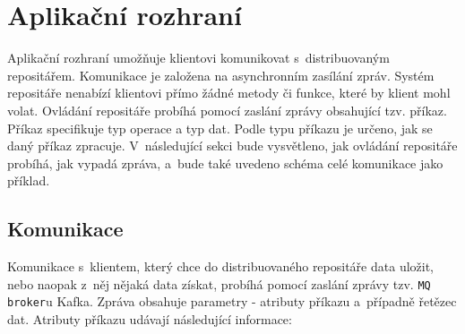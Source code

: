 \section{Aplikační rozhraní}
Aplikační rozhraní umožňuje klientovi komunikovat s~distribuovaným repositářem. Komunikace je založena na asynchronním zasílání zpráv. Systém repositáře nenabízí klientovi přímo žádné metody či funkce, které by klient mohl volat. Ovládání repositáře probíhá pomocí zaslání zprávy obsahující tzv. příkaz. Příkaz specifikuje typ operace a typ dat. Podle typu příkazu je určeno, jak se daný příkaz zpracuje. V~následující sekci bude vysvětleno, jak ovládání repositáře probíhá, jak vypadá zpráva, a~bude také uvedeno schéma celé komunikace jako příklad.

\subsection{Komunikace}
Komunikace s~klientem, který chce do distribuovaného repositáře data uložit, nebo naopak z~něj nějaká data získat, probíhá pomocí zaslání zprávy tzv. \texttt{MQ broker}u Kafka. Zpráva obsahuje parametry - atributy příkazu a~případně řetězec dat. Atributy příkazu udávají následující informace:

